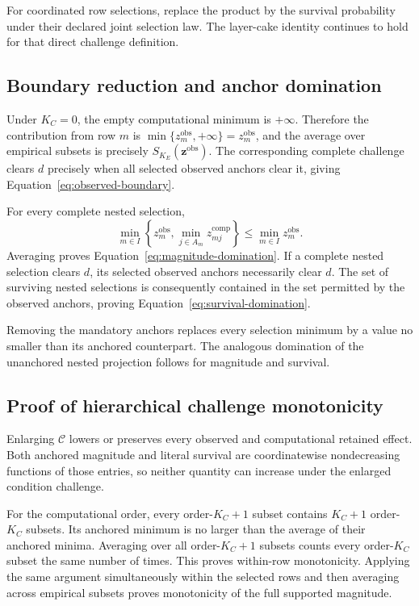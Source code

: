 \documentclass[11pt]{article}
\newcommand{\CSet}{\mathcal{C}}
\theoremstyle{remark}
\begin{document}
For coordinated row selections, replace the product by the survival
probability under their declared joint selection law. The layer-cake identity
continues to hold for that direct challenge definition.

\subsection{Boundary reduction and anchor domination}

Under $K_C=0$, the empty computational minimum is $+\infty$. Therefore
the contribution from row $m$ is
$\min\{z_m^{\mathrm{obs}},+\infty\}=z_m^{\mathrm{obs}}$, and the average over
empirical subsets is precisely $S_{K_E}(\mathbf z^{\mathrm{obs}})$. The
corresponding complete challenge clears $d$ precisely when all selected
observed anchors clear it, giving Equation~\eqref{eq:observed-boundary}.

For every complete nested selection,
\[
\min_{m\in I}
\left\{z_m^{\mathrm{obs}},
\min_{j\in A_m}z_{mj}^{\mathrm{comp}}\right\}
\leq
\min_{m\in I}z_m^{\mathrm{obs}}.
\]
Averaging proves Equation~\eqref{eq:magnitude-domination}. If a complete
nested selection clears $d$, its selected observed anchors necessarily clear
$d$. The set of surviving nested selections is consequently contained in the
set permitted by the observed anchors, proving
Equation~\eqref{eq:survival-domination}.

Removing the mandatory anchors replaces every selection minimum by a value no
smaller than its anchored counterpart. The analogous domination of the
unanchored nested projection follows for magnitude and survival.

\subsection{Proof of hierarchical challenge monotonicity}

Enlarging $\CSet$ lowers or preserves every observed and computational retained
effect. Both anchored magnitude and literal survival are coordinatewise
nondecreasing functions of those entries, so neither quantity can increase
under the enlarged condition challenge.

For the computational order, every order-$K_C+1$ subset contains
$K_C+1$ order-$K_C$ subsets. Its anchored minimum is no larger than the
average of their anchored minima. Averaging over all order-$K_C+1$ subsets
counts every order-$K_C$ subset the same number of times. This proves
within-row monotonicity. Applying the same argument simultaneously within the
selected rows and then averaging across empirical subsets proves monotonicity
of the full supported magnitude.
\end{document}
